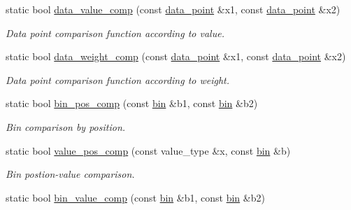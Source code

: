 \begin{DoxyCompactItemize}
\item 
\hypertarget{a00280_a180bb6560a6b52227443d7f5399d6abb}{static bool \hyperlink{a00280_a180bb6560a6b52227443d7f5399d6abb}{data\-\_\-value\-\_\-comp} (const \hyperlink{a00116}{data\-\_\-point} \&x1, const \hyperlink{a00116}{data\-\_\-point} \&x2)}\label{a00280_a180bb6560a6b52227443d7f5399d6abb}

\begin{DoxyCompactList}\small\item\em Data point comparison function according to value. \end{DoxyCompactList}\item 
\hypertarget{a00280_a5354c06b243a5a1de746ecac7d148ceb}{static bool \hyperlink{a00280_a5354c06b243a5a1de746ecac7d148ceb}{data\-\_\-weight\-\_\-comp} (const \hyperlink{a00116}{data\-\_\-point} \&x1, const \hyperlink{a00116}{data\-\_\-point} \&x2)}\label{a00280_a5354c06b243a5a1de746ecac7d148ceb}

\begin{DoxyCompactList}\small\item\em Data point comparison function according to weight. \end{DoxyCompactList}\item 
\hypertarget{a00280_a612440dcebdb0e4449a781854de8933a}{static bool \hyperlink{a00280_a612440dcebdb0e4449a781854de8933a}{bin\-\_\-pos\-\_\-comp} (const \hyperlink{a00028}{bin} \&b1, const \hyperlink{a00028}{bin} \&b2)}\label{a00280_a612440dcebdb0e4449a781854de8933a}

\begin{DoxyCompactList}\small\item\em Bin comparison by position. \end{DoxyCompactList}\item 
\hypertarget{a00280_a9945d8887d608c45a7be390ab073a6e2}{static bool \hyperlink{a00280_a9945d8887d608c45a7be390ab073a6e2}{value\-\_\-pos\-\_\-comp} (const value\-\_\-type \&x, const \hyperlink{a00028}{bin} \&b)}\label{a00280_a9945d8887d608c45a7be390ab073a6e2}

\begin{DoxyCompactList}\small\item\em Bin postion-\/value comparison. \end{DoxyCompactList}\item 
\hypertarget{a00280_aa29cb6ea9d66cdc88c6c333f4d34803a}{static bool \hyperlink{a00280_aa29cb6ea9d66cdc88c6c333f4d34803a}{bin\-\_\-value\-\_\-comp} (const \hyperlink{a00028}{bin} \&b1, const \hyperlink{a00028}{bin} \&b2)}\label{a00280_aa29cb6ea9d66cdc88c6c333f4d34803a}


\end{DoxyCompactItemize}
